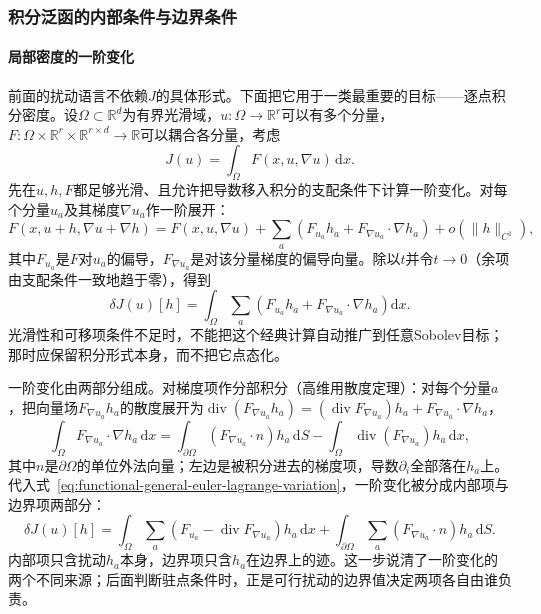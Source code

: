 \subsubsection{积分泛函的内部条件与边界条件}
\label{subsubsec:integral-functional-variation}

\paragraph{局部密度的一阶变化}

前面的扰动语言不依赖$J$的具体形式。下面把它用于一类最重要的目标——逐点积分密度。设$\Omega\subset\mathbb R^d$为有界光滑域，$u:\Omega\to\mathbb R^r$可以有多个分量，$F:\Omega\times\mathbb R^r\times\mathbb R^{r\times d}\to\mathbb R$可以耦合各分量，考虑
\[
  J(u)=\int_\Omega F(x,u,\nabla u)\,\mathrm dx.
\]
先在$u,h,F$都足够光滑、且允许把导数移入积分的支配条件下计算一阶变化。对每个分量$u_a$及其梯度$\nabla u_a$作一阶展开：
\[
  F(x,u+h,\nabla u+\nabla h)
  =F(x,u,\nabla u)
  +\sum_a\left(F_{u_a}h_a+F_{\nabla u_a}\cdot\nabla h_a\right)+o(\|h\|_{C^1}),
\]
其中$F_{u_a}$是$F$对$u_a$的偏导，$F_{\nabla u_a}$是对该分量梯度的偏导向量。除以$t$并令$t\to0$（余项由支配条件一致地趋于零），得到
\begin{equation}
  \delta J(u)[h]
  =\int_\Omega\sum_a
  \left(F_{u_a}h_a+F_{\nabla u_a}\cdot\nabla h_a\right)\mathrm dx.
  \label{eq:functional-general-euler-lagrange-variation}
\end{equation}
光滑性和可移项条件不足时，不能把这个经典计算自动推广到任意Sobolev目标；那时应保留积分形式本身，而不把它点态化。

一阶变化由两部分组成。对梯度项作分部积分（高维用散度定理）：对每个分量$a$，把向量场$F_{\nabla u_a}h_a$的散度展开为$\operatorname{div}(F_{\nabla u_a}h_a)=(\operatorname{div}F_{\nabla u_a})h_a+F_{\nabla u_a}\cdot\nabla h_a$，
\[
  \int_\Omega F_{\nabla u_a}\cdot\nabla h_a\,\mathrm dx
  =\int_{\partial\Omega}(F_{\nabla u_a}\cdot n)h_a\,\mathrm dS
  -\int_\Omega \operatorname{div}(F_{\nabla u_a})h_a\,\mathrm dx,
\]
其中$n$是$\partial\Omega$的单位外法向量；左边是被积分进去的梯度项，导数$\partial_i$全部落在$h_a$上。代入式~\eqref{eq:functional-general-euler-lagrange-variation}，一阶变化被分成内部项与边界项两部分：
\[
  \delta J(u)[h]
  =\int_\Omega\sum_a
  \left(F_{u_a}-\operatorname{div}F_{\nabla u_a}\right)h_a\,\mathrm dx
  +\int_{\partial\Omega}\sum_a
  \left(F_{\nabla u_a}\cdot n\right)h_a\,\mathrm dS.
\]
内部项只含扰动$h_a$本身，边界项只含$h_a$在边界上的迹。这一步说清了一阶变化的两个不同来源；后面判断驻点条件时，正是可行扰动的边界值决定两项各自由谁负责。

